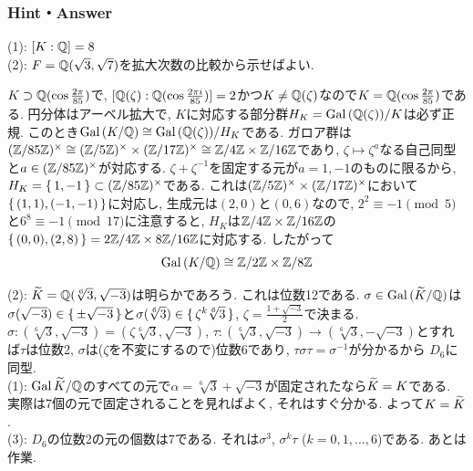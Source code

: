 \subsubsection{Hint・Answer}
{\small
\begin{probans}
(1): $[K:\mathbb{Q}] = 8$\\
(2): $F=\mathbb{Q}(\sqrt{3},\sqrt{7})$を拡大次数の比較から示せばよい.
\end{probans}

\begin{probans}
$K\supset \mathbb{Q}(\cos{\frac{2\pi }{85}})$で, $[\mathbb{Q}(\zeta): \mathbb{Q}(\cos{\frac{2\pi i}{85}})] = 2$かつ$K\neq \mathbb{Q}(\zeta)$なので$K=\mathbb{Q}(\cos{\frac{2\pi }{85}})$である. 円分体はアーベル拡大で, $K$に対応する部分群$H_K = \operatorname{Gal}{(\mathbb{Q}(\zeta))/K}$は必ず正規. このとき$\operatorname{Gal}{(K/\mathbb{Q})}\cong \operatorname{Gal}{(\mathbb{Q}(\zeta))}/H_K$である.  ガロア群は$(\mathbb{Z}/85\mathbb{Z})^{\times}\cong (\mathbb{Z}/5\mathbb{Z})^{\times} \times (\mathbb{Z}/17\mathbb{Z})^{\times} \cong \mathbb{Z}/4\mathbb{Z}\times \mathbb{Z}/16\mathbb{Z}$であり, $\zeta\mapsto \zeta^a$なる自己同型と$a\in (\mathbb{Z}/85\mathbb{Z})^{\times}$が対応する. $\zeta + \zeta^{-1}$を固定する元が$a=1,-1$のものに限るから, $H_K = \set{1,-1}\subset (\mathbb{Z}/85\mathbb{Z})^{\times}$である. これは$(\mathbb{Z}/5\mathbb{Z})^{\times}\times (\mathbb{Z}/17\mathbb{Z})^{\times}$において$\set{(1,1), (-1,-1)}$に対応し, 生成元は$(2,0)$と$(0,6)$なので, $2^2 \equiv -1\pmod{5}$と$6^8 \equiv -1\pmod{17}$に注意すると, $H_K$は$\mathbb{Z}/4\mathbb{Z}\times \mathbb{Z}/16\mathbb{Z}$の$\set{(0,0),(2,8)} = 2\mathbb{Z}/4\mathbb{Z}\times 8\mathbb{Z}/16\mathbb{Z}$に対応する. したがって
\[\operatorname{Gal}{(K/\mathbb{Q})} \cong \mathbb{Z}/2\mathbb{Z}\times \mathbb{Z}/8\mathbb{Z}\]
\end{probans}


\begin{probans}
(2): $\widetilde{K} = \mathbb{Q}(\sqrt[6]{3}, \sqrt{-3})$は明らかであろう. これは位数12である. $\sigma\in \operatorname{Gal}{(\widetilde{K}/\mathbb{Q})}$は$\sigma(\sqrt{-3}) \in \set{\pm \sqrt{-3}}$と$\sigma(\sqrt[6]{3})\in \set{\zeta^k \sqrt[6]{3}}$, $\zeta = \frac{1+\sqrt{-3}}{2}$で決まる. $\sigma: (\sqrt[6]{3},\sqrt{-3}) = (\zeta\sqrt[6]{3}, \sqrt{-3})$, $\tau:(\sqrt[6]{3},\sqrt{-3}) \to (\sqrt[6]{3}, -\sqrt{-3})$とすれば$\tau$は位数2, $\sigma$は($\zeta$を不変にするので)位数6であり, $\tau\sigma\tau = \sigma^{-1}$が分かるから $D_{6}$に同型. \\
(1): $\operatorname{Gal}{\widetilde{K}/\mathbb{Q}}$のすべての元で$\alpha=\sqrt[6]{3} + \sqrt{-3}$が固定されたなら$\widetilde{K} = K$である. 実際は7個の元で固定されることを見ればよく, それはすぐ分かる. よって$K=\widetilde{K}$.
\\
(3): $D_6$の位数2の元の個数は$7$である. それは$\sigma^3$, $\sigma^k \tau$ ($k=0,1,\dots, 6$)である. あとは作業.
\end{probans}


}

\clearpage
